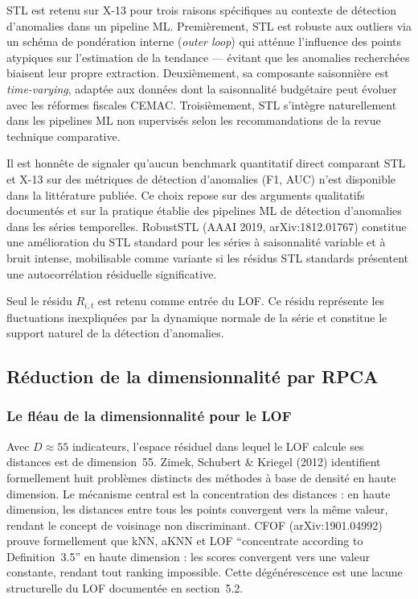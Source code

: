 \documentclass[12pt,a4paper]{article}
\begin{document}
STL est retenu sur X-13 pour trois raisons spécifiques au contexte de
détection d'anomalies dans un pipeline ML. Premièrement, STL est robuste
aux outliers via un schéma de pondération interne (\textit{outer loop}) qui
atténue l'influence des points atypiques sur l'estimation de la tendance ---
évitant que les anomalies recherchées biaisent leur propre extraction.
Deuxièmement, sa composante saisonnière est \textit{time-varying}, adaptée
aux données dont la saisonnalité budgétaire peut évoluer avec les réformes
fiscales CEMAC. Troisièmement, STL s'intègre naturellement dans les pipelines
ML non supervisés selon les recommandations de la revue technique comparative.

Il est honnête de signaler qu'aucun benchmark quantitatif direct comparant
STL et X-13 sur des métriques de détection d'anomalies (F1, AUC) n'est
disponible dans la littérature publiée. Ce choix repose sur des arguments
qualitatifs documentés et sur la pratique établie des pipelines ML de
détection d'anomalies dans les séries temporelles. RobustSTL (AAAI 2019,
arXiv:1812.01767) constitue une amélioration du STL standard pour les séries
à saisonnalité variable et à bruit intense, mobilisable comme variante si
les résidus STL standards présentent une autocorrélation résiduelle
significative.

Seul le résidu $R_{i,t}$ est retenu comme entrée du LOF. Ce résidu représente
les fluctuations inexpliquées par la dynamique normale de la série et constitue
le support naturel de la détection d'anomalies.

\subsection{Réduction de la dimensionnalité par RPCA}

\subsubsection{Le fléau de la dimensionnalité pour le LOF}

Avec $D \approx 55$ indicateurs, l'espace résiduel dans lequel le LOF calcule
ses distances est de dimension~55. Zimek, Schubert \& Kriegel (2012) identifient
formellement huit problèmes distincts des méthodes à base de densité en haute
dimension. Le mécanisme central est la concentration des distances : en haute
dimension, les distances entre tous les points convergent vers la même valeur,
rendant le concept de voisinage non discriminant. CFOF (arXiv:1901.04992) prouve
formellement que kNN, aKNN et LOF ``concentrate according to Definition~3.5''
en haute dimension : les scores convergent vers une valeur constante, rendant
tout ranking impossible. Cette dégénérescence est une lacune structurelle du
LOF documentée en section~5.2.
\end{document}
